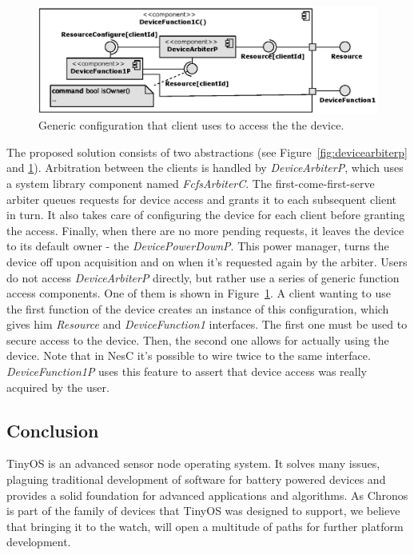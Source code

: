 \begin{figure}[h]
  \centering
  \includegraphics[width=1.0\textwidth]{diagrams/devicefunction1c.eps}
  \caption{Generic configuration that client uses to access the
  the device.}
  \label{fig:devicefunction1}
\end{figure}
The proposed solution consists of two abstractions (see Figure~\ref{fig:devicearbiterp} and \ref{fig:devicefunction1}). Arbitration between the clients is handled by \emph{DeviceArbiterP}, which uses a system library component named \emph{FcfsArbiterC}. The first-come-first-serve arbiter queues requests for device access and grants it to each subsequent client in turn. It also takes care of configuring the device for each client before granting the access. Finally, when there are no more pending requests, it leaves the device to its default owner - the \emph{DevicePowerDownP}. This power manager, turns the device off upon acquisition and  on when it's requested again by the arbiter. Users do not access \emph{DeviceArbiterP} directly, but rather use a series of generic function access components. One of them is shown in Figure~\ref{fig:devicefunction1}.
A client wanting to use the first function of the device creates an instance of this configuration, which gives him \emph{Resource} and \emph{DeviceFunction1} interfaces. The first one must be used to secure access to the device.  Then, the second one allows for actually using the device.  Note that in NesC it's possible to wire twice to the same interface.  \emph{DeviceFunction1P} uses this feature to assert that device access was really acquired by the user.

\subsection{Conclusion}
TinyOS is an advanced sensor node operating system. It solves many issues, plaguing traditional development of software for battery powered devices and provides a solid foundation for advanced applications and algorithms. As Chronos is part of the family of devices that TinyOS was designed to support, we believe that bringing it to the watch, will open a multitude of paths for further platform development.



